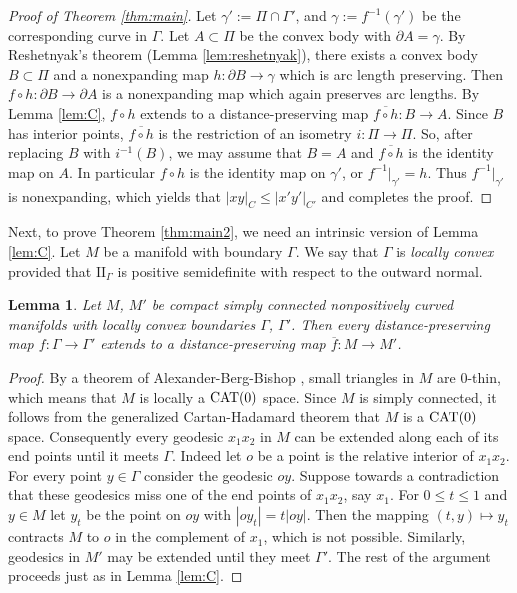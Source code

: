 \documentclass[11pt]{amsart}
\newtheorem{lemma}[theorem]{Lemma}
\theoremstyle{definition}
\newcommand{\ol}{\overline}
\newcommand{\ff}{\mathrm{I\!I}}
\begin{document}
\begin{proof}[Proof of Theorem \ref{thm:main}]
Let $\gamma':=\Pi\cap\Gamma'$, and $\gamma:=f^{-1}(\gamma')$ be the corresponding curve in $\Gamma$. Let $A\subset\Pi$ be the convex body with $\partial A=\gamma$.
By Reshetnyak's theorem (Lemma \ref{lem:reshetnyak}), there exists a convex body $B\subset \Pi$ and a nonexpanding map  $h\colon \partial B\to \gamma$ which is arc length preserving. Then $f\circ h\colon \partial B\to\partial A$ is a nonexpanding map which again preserves arc lengths. By Lemma \ref{lem:C},   $f\circ h$ extends to a distance-preserving map $\ol{f\circ h}\colon B\to A$. Since $B$ has interior points, $\ol{f\circ h}$ is the restriction of an isometry $i\colon \Pi\to\Pi$. So, after replacing $B$ with $i^{-1}(B)$, we 
may assume that $B=A$ and $\ol{f\circ h}$ is the identity map on $A$. In particular $f\circ h$ is the identity map on $\gamma'$, or $f^{-1}|_{\gamma'}=h$. Thus $f^{-1}|_{\gamma'}$ is nonexpanding, which yields that $|xy|_C\leq |x'y'|_{C'}$ and completes the proof. 
\end{proof}

Next, to prove Theorem \ref{thm:main2}, we need an intrinsic version of Lemma \ref{lem:C}. Let $M$ be a manifold with boundary $\Gamma$. We say that $\Gamma$ is \emph{locally convex} provided that $\ff_\Gamma$ is positive semidefinite with respect to the outward normal.

\begin{lemma}\label{lem:C2}
Let $M$, $M'$ be compact simply connected nonpositively curved manifolds with locally convex boundaries $\Gamma$, $\Gamma'$. Then every distance-preserving map $f\colon \Gamma\to\Gamma'$ extends to a distance-preserving map $\ol  f \colon M\to M'$.
\end{lemma}
\begin{proof}
By a theorem of Alexander-Berg-Bishop \cite{Alexander-Berg-Bishop1993} \cite[Thm. 4.91]{akp2019b}, small  triangles in $M$ are $0$-thin, which means that $M$ is locally a $\textup{CAT}(0)$ space. Since $M$ is simply connected, it follows from the generalized Cartan-Hadamard theorem  \cite{alexander-bishop1990,bridson-haefliger1999,bbi2001} that $M$ is a $\textup{CAT}(0)$ space.  Consequently every geodesic $x_1x_2$ in $M$ can be extended along each of its end points until it meets $\Gamma$. Indeed let $o$ be a point is the relative interior of $x_1x_2$. For every point $y\in\Gamma$ consider the geodesic $oy$. Suppose towards a contradiction that these geodesics miss one of the end points of $x_1x_2$, say $x_1$. For $0\leq t\leq 1$ and $y\in M$ let $y_t$ be the point on $oy$ with $|oy_t|=t|oy|$. Then the mapping $(t,y)\mapsto y_t$ contracts $M$ to $o$ in the complement of $x_1$, which is not possible. Similarly, geodesics in $M'$ may be extended until they meet $\Gamma'$. The rest of the argument proceeds just as in Lemma \ref{lem:C}.
\end{proof}
\end{document}
